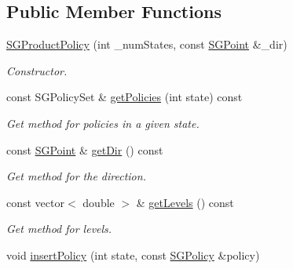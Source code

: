 \subsection*{Public Member Functions}
\begin{DoxyCompactItemize}
\item 
\mbox{\label{classSGProductPolicy_aa822b9975e47f654ab4311b35a597473}} 
\hyperlink{classSGProductPolicy_aa822b9975e47f654ab4311b35a597473}{S\+G\+Product\+Policy} (int \+\_\+num\+States, const \hyperlink{classSGPoint}{S\+G\+Point} \&\+\_\+dir)
\begin{DoxyCompactList}\small\item\em Constructor. \end{DoxyCompactList}\item 
\mbox{\label{classSGProductPolicy_add72243a393131f102540126aea8859a}} 
const S\+G\+Policy\+Set \& \hyperlink{classSGProductPolicy_add72243a393131f102540126aea8859a}{get\+Policies} (int state) const
\begin{DoxyCompactList}\small\item\em Get method for policies in a given state. \end{DoxyCompactList}\item 
\mbox{\label{classSGProductPolicy_ab9ba1bb8485b50ad98957a3c6cd85e9a}} 
const \hyperlink{classSGPoint}{S\+G\+Point} \& \hyperlink{classSGProductPolicy_ab9ba1bb8485b50ad98957a3c6cd85e9a}{get\+Dir} () const
\begin{DoxyCompactList}\small\item\em Get method for the direction. \end{DoxyCompactList}\item 
\mbox{\label{classSGProductPolicy_af9c6f66468315d4091bbba12a4d44b56}} 
const vector$<$ double $>$ \& \hyperlink{classSGProductPolicy_af9c6f66468315d4091bbba12a4d44b56}{get\+Levels} () const
\begin{DoxyCompactList}\small\item\em Get method for levels. \end{DoxyCompactList}\item 
\mbox{\label{classSGProductPolicy_a936a5504d92977a627724e8b45066b54}} 
void \hyperlink{classSGProductPolicy_a936a5504d92977a627724e8b45066b54}{insert\+Policy} (int state, const \hyperlink{classSGPolicy}{S\+G\+Policy} \&policy)

\end{DoxyCompactItemize}
